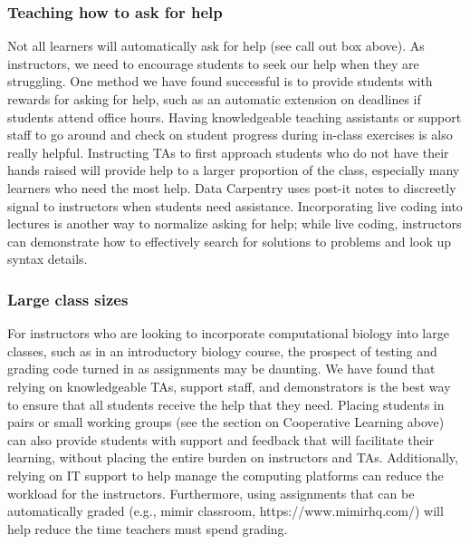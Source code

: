 \subsubsection{Teaching how to ask for help}
Not all learners will automatically ask for help (see call out box above). 
As instructors, we need to encourage students to seek our help when they are struggling.
One method we have found successful is to provide students with rewards for asking for help, such as an automatic extension on deadlines if students attend office hours.
Having knowledgeable teaching assistants or support staff to go around and check on student progress during in-class exercises is also really helpful.
Instructing TAs to first approach students who do not have their hands raised will provide help to a larger proportion of the class, especially many learners who need the most help.
Data Carpentry uses post-it notes to discreetly signal to instructors when students need assistance.
Incorporating live coding into lectures is another way to normalize asking for help; while live coding, instructors can demonstrate how to effectively search for solutions to problems and look up syntax details.

\subsubsection{Large class sizes}

For instructors who are looking to incorporate computational biology into large classes, such as in an introductory biology course, the prospect of testing and grading code turned in as assignments may be daunting. 
We have found that relying on knowledgeable TAs, support staff, and demonstrators is the best way to ensure that all students receive the help that they need.
Placing students in pairs or small working groups (see the section on Cooperative Learning above) can also provide students with support and feedback that will facilitate their learning, without placing the entire burden on instructors and TAs.
Additionally, relying on IT support to help manage the computing platforms can reduce the workload for the instructors.
Furthermore, using assignments that can be automatically graded (e.g., mimir classroom, https://www.mimirhq.com/) will help reduce the time teachers must spend grading.



